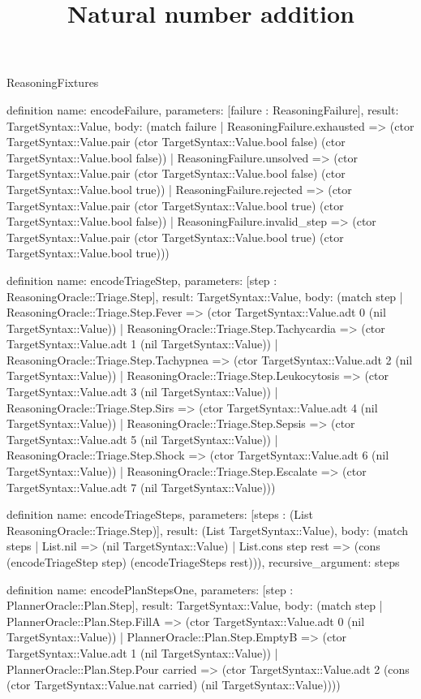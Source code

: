 \begin{lexlean}{ReasoningFixtures}
\title{Natural number addition}
\begin{semanticmodule}
definition{
  name: encodeFailure,
  parameters: [failure : ReasoningFailure],
  result: TargetSyntax::Value,
  body: (match failure
    | ReasoningFailure.exhausted => (ctor TargetSyntax::Value.pair (ctor TargetSyntax::Value.bool false) (ctor TargetSyntax::Value.bool false))
    | ReasoningFailure.unsolved => (ctor TargetSyntax::Value.pair (ctor TargetSyntax::Value.bool false) (ctor TargetSyntax::Value.bool true))
    | ReasoningFailure.rejected => (ctor TargetSyntax::Value.pair (ctor TargetSyntax::Value.bool true) (ctor TargetSyntax::Value.bool false))
    | ReasoningFailure.invalid_step => (ctor TargetSyntax::Value.pair (ctor TargetSyntax::Value.bool true) (ctor TargetSyntax::Value.bool true)))
}

definition{
  name: encodeTriageStep,
  parameters: [step : ReasoningOracle::Triage.Step],
  result: TargetSyntax::Value,
  body: (match step
    | ReasoningOracle::Triage.Step.Fever => (ctor TargetSyntax::Value.adt 0 (nil TargetSyntax::Value))
    | ReasoningOracle::Triage.Step.Tachycardia => (ctor TargetSyntax::Value.adt 1 (nil TargetSyntax::Value))
    | ReasoningOracle::Triage.Step.Tachypnea => (ctor TargetSyntax::Value.adt 2 (nil TargetSyntax::Value))
    | ReasoningOracle::Triage.Step.Leukocytosis => (ctor TargetSyntax::Value.adt 3 (nil TargetSyntax::Value))
    | ReasoningOracle::Triage.Step.Sirs => (ctor TargetSyntax::Value.adt 4 (nil TargetSyntax::Value))
    | ReasoningOracle::Triage.Step.Sepsis => (ctor TargetSyntax::Value.adt 5 (nil TargetSyntax::Value))
    | ReasoningOracle::Triage.Step.Shock => (ctor TargetSyntax::Value.adt 6 (nil TargetSyntax::Value))
    | ReasoningOracle::Triage.Step.Escalate => (ctor TargetSyntax::Value.adt 7 (nil TargetSyntax::Value)))
}

definition{
  name: encodeTriageSteps,
  parameters: [steps : (List ReasoningOracle::Triage.Step)],
  result: (List TargetSyntax::Value),
  body: (match steps
    | List.nil => (nil TargetSyntax::Value)
    | List.cons step rest => (cons (encodeTriageStep step) (encodeTriageSteps rest))),
  recursive_argument: steps
}

definition{
  name: encodePlanStepsOne,
  parameters: [step : PlannerOracle::Plan.Step],
  result: TargetSyntax::Value,
  body: (match step
    | PlannerOracle::Plan.Step.FillA => (ctor TargetSyntax::Value.adt 0 (nil TargetSyntax::Value))
    | PlannerOracle::Plan.Step.EmptyB => (ctor TargetSyntax::Value.adt 1 (nil TargetSyntax::Value))
    | PlannerOracle::Plan.Step.Pour carried => (ctor TargetSyntax::Value.adt 2 (cons (ctor TargetSyntax::Value.nat carried) (nil TargetSyntax::Value))))
}


\end{semanticmodule}
\end{lexlean}
